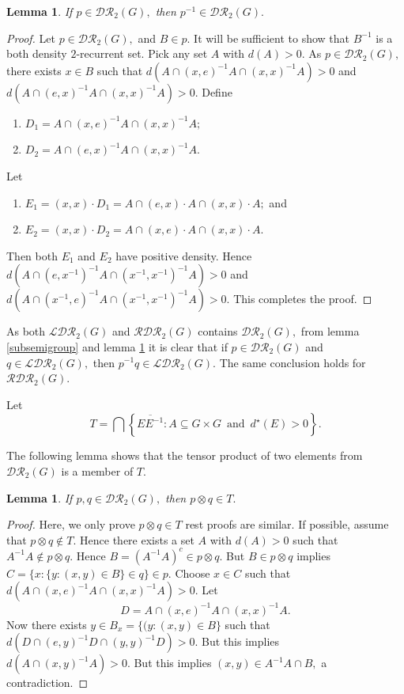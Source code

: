 \documentclass{article}
\theoremstyle{Theorem}
\newtheorem{lem}[thm]{Lemma}
\theoremstyle{definition}
\begin{document}
\begin{lem}\label{inverse}
    If $p\in \mathcal{DR}_2(G),$ then $p^{-1}\in \mathcal{DR}_2(G).$ 
\end{lem}
\begin{proof}
    Let $p\in \mathcal{DR}_2(G),$ and $B\in p.$ It will be sufficient to show that $B^{-1}$ is a both density $2$-recurrent set. Pick any set $A$ with $d(A)>0.$ As $p\in \mathcal{DR}_2(G),$  there exists $x\in B$ such that $d(A \cap (x,e)^{-1}A \cap (x,x)^{-1}A)>0$ and  $d(A \cap (e,x)^{-1}A \cap (x,x)^{-1}A)>0.$ Define 

\begin{enumerate}
    \item $D_1=A \cap (x,e)^{-1}A \cap (x,x)^{-1}A;$
    \item $D_2=A \cap (e,x)^{-1}A \cap (x,x)^{-1}A.$
\end{enumerate}
Let 
\begin{enumerate}
    \item $E_1=(x,x)\cdot D_1=A\cap (e,x)\cdot A\cap (x,x)\cdot A;$ and
    \item $E_2=(x,x)\cdot D_2=A\cap (x,e)\cdot A\cap (x,x)\cdot A.$
\end{enumerate}
Then both $E_1$ and $E_2$ have positive density. Hence $d(A\cap (e,x^{-1})^{-1} A\cap (x^{-1},x^{-1})^{-1} A)>0$ and $d(A\cap (x^{-1},e)^{-1} A\cap (x^{-1},x^{-1})^{-1} A)>0.$ This completes the proof.
\end{proof}

As both $\mathcal{LDR}_2(G)$ and $ \mathcal{RDR}_2(G)$ contains $ \mathcal{DR}_2(G),$
from lemma \ref{subsemigroup} and lemma \ref{inverse} it is clear that if $p\in \mathcal{DR}_2(G)$ and $q\in \mathcal{LDR}_2(G),$ then $p^{-1}q\in \mathcal{LDR}_2(G).$ The same conclusion holds for $ \mathcal{RDR}_2(G).$ 

Let $$T=\bigcap \left\lbrace \overline{EE^{-1}}: A\subseteq G\times G\, \text{ and } \, d^\star(E)>0 \right\rbrace.$$


The following lemma shows that the tensor product of two elements from $\mathcal{DR}_2(G)$ is a member of $T.$

\begin{lem}\label{tensor}
    If $p,q\in \mathcal{DR}_2(G),$ then $ p\otimes q\in T.$ 
\end{lem}
\begin{proof}
Here, we only prove $p\otimes q\in T$ rest proofs are similar.
    If possible, assume that $p\otimes q\notin T.$ Hence there exists a set $A$ with $d(A)>0$ such that $A^{-1}A\notin p\otimes q.$ Hence $B=(A^{-1}A)^c\in p\otimes q.$ But $B\in p\otimes q$ implies $C=\{x:\{y:(x,y)\in B\}\in q\}\in p.$ Choose $x\in C$ such that $d(A\cap (x,e)^{-1}A\cap (x,x)^{-1}A)>0.$ Let $$D=A\cap (x,e)^{-1}A\cap (x,x)^{-1}A.$$ Now there exists $y\in B_x=\{(y:(x,y)\in B\}$ such that $d(D\cap (e,y)^{-1}D\cap (y,y)^{-1}D)>0.$ But this implies $d(A\cap (x,y)^{-1}A)>0.$ But this implies $(x,y)\in A^{-1}A\cap B,$ a contradiction.
\end{proof}
\end{document}
